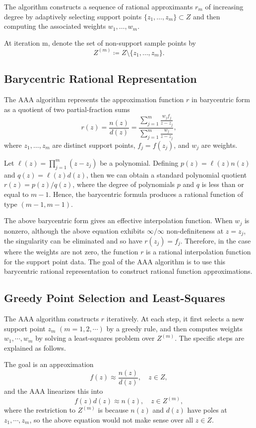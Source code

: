 \documentclass[12pt,a4paper]{article}  %
\theoremstyle{definition}
\numberwithin{equation}{section}
\begin{document}
The algorithm constructs a sequence of rational approximants $r_m$ of increasing degree by adaptively selecting support points $\{z_1,\dots,z_m\}\subset Z$ and then computing the associated weights $w_1,\dots,w_m$.

At iteration m, denote the set of non-support sample points by
\[
Z^{(m)}\coloneqq Z \setminus \{z_1,\dots,z_m\}.
\]

\subsection{Barycentric Rational Representation}
The AAA algorithm represents the approximation function $r$ in barycentric form as a quotient of two partial-fraction sums
\begin{equation}
    r(z)=\frac{n(z)}{d(z)}=\frac{\sum\limits_{j=1}^m\frac{w_jf_j}{z-z_j}}{\sum\limits_{j=1}^m\frac{w_j}{z-z_j}},  \label{eq:r}
\end{equation}
where $z_1,\dots,z_m$ are distinct support points, $f_j=f(z_j)$, and $w_j$ are weights.

Let $\ell(z)=\prod\limits_{j=1}^m (z-z_j)$ be a polynomial. Defining $p(z)=\ell(z)n(z)$ and $q(z)=\ell(z)d(z)$, then we can obtain a standard polynomial quotient $r(z)=p(z)/q(z)$, where the degree of polynomials $p$ and $q$ is less than or equal to $m-1$. Hence, the barycentric formula produces a rational function of type $(m-1,m-1)$.

The above barycentric form gives an effective interpolation function. When $w_j$ is nonzero, although the above equation exhibits $\infty/\infty$ non-definiteness at $z=z_j$, the singularity can be eliminated and so have $r(z_j)=f_j$. Therefore, in the case where the weights are not zero, the function $r$ is a rational interpolation function for the support point data. The goal of the AAA algorithm is to use this barycentric rational representation to construct rational function approximations.

\subsection{Greedy Point Selection and Least-Squares}
The AAA algorithm constructs $r$ iteratively. At each step, it first selects a new support point $z_m$ $(m=1, 2,\cdots )$ by a greedy rule, and then computes weights $w_1,\cdots, w_m$ by solving a least-squares problem over $Z^{(m)}$. The specific steps are explained as follows.

The goal is an approximation
\begin{equation}
    f(z)\approx\frac{n(z)}{d(z)}, \quad z\in Z, \label{eq:approx}
\end{equation}
and the AAA linearizes this into
\begin{equation}
    f(z)d(z)\approx n(z), \quad z\in Z^{(m)}, \label{eq:linearized}
\end{equation}
where the restriction to $Z^{(m)}$ is because $n(z)$ and $d(z)$ have poles at $z_1,\cdots,z_m$, so the above equation would not make sense over all $z\in Z$.
\end{document}
